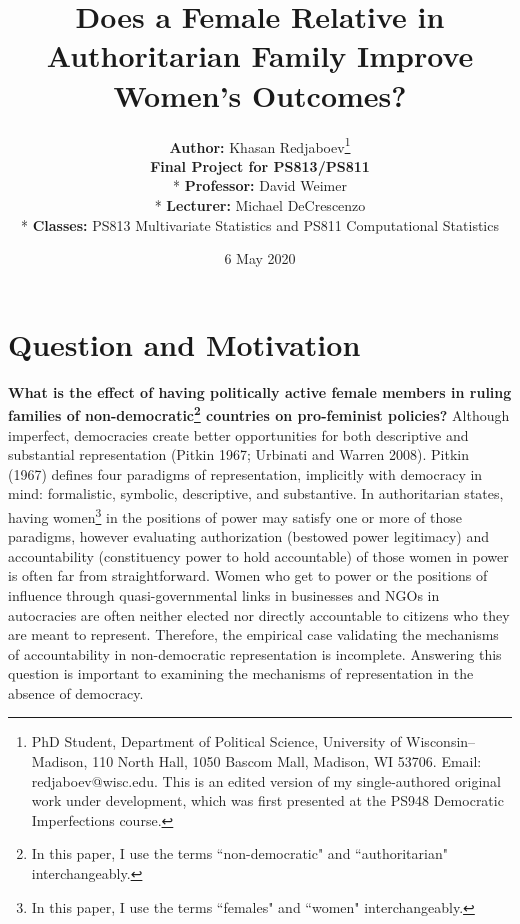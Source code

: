 \documentclass[12pt]{article}
\begin{document}
\begin{titlepage}
\centering

\title{Does a Female Relative in Authoritarian Family Improve Women's Outcomes?} 
\author{\textbf{Author:} Khasan Redjaboev\footnote{PhD Student, Department of Political Science, University of Wisconsin–Madison, 110 North Hall, 1050 Bascom Mall, Madison, WI 53706. Email: redjaboev@wisc.edu. This is an edited version of my single-authored original work under development, which was first presented at the PS948 Democratic Imperfections course.}\\
\textbf{Final Project for PS813/PS811} 
\\* \textbf{Professor:} David Weimer
\\* \textbf{Lecturer:} Michael DeCrescenzo
\\* \textbf{Classes:} PS813 Multivariate Statistics and PS811 Computational Statistics}
\date{6 May 2020}
\end{titlepage}

\maketitle


\newpage
\doublespacing

\section*{Question and Motivation}
\textbf{What is the effect of having politically active female members in ruling families of non-democratic\footnote{In this paper, I use the terms ``non-democratic" and ``authoritarian" interchangeably.} countries on pro-feminist policies?} Although imperfect, democracies create better opportunities for both descriptive and substantial representation (Pitkin 1967; Urbinati and Warren 2008). Pitkin (1967) defines four paradigms of representation, implicitly with democracy in mind: formalistic, symbolic, descriptive, and substantive. In authoritarian states, having women\footnote{In this paper, I use the terms ``females" and ``women" interchangeably.} in the positions of power may satisfy one or more of those paradigms, however evaluating authorization (bestowed power legitimacy) and accountability (constituency power to hold accountable) of those women in power is often far from straightforward. Women who get to power or the positions of influence through quasi-governmental links in businesses and NGOs in autocracies are often neither elected nor directly accountable to citizens who they are meant to represent. Therefore, the empirical case validating the mechanisms of accountability in  non-democratic representation is incomplete. Answering this question is important to examining the mechanisms of representation in the absence of democracy. 
\end{document}
